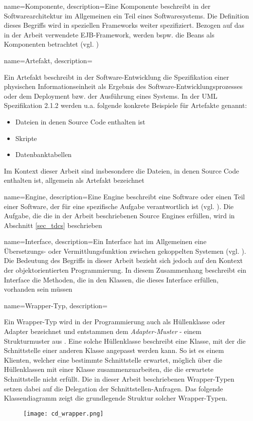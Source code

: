 

{
    name=Komponente,
    description={Eine Komponente beschreibt in der Softwarearchitektur im Allgemeinen ein Teil eines Softwaresystems. Die Definition dieses Begriffs wird in speziellen Frameworks weiter spezifiziert. Bezogen auf das in der Arbeit verwendete EJB-Framework, werden bspw. die Beans als Komponenten betrachtet (vgl. \cite{ejbspec})}
}
{
    name=Artefakt,
    description={Ein Artefakt beschreibt in der Software-Entwicklung die Spezifikation einer physischen Informationseinheit als Ergebnis des Software-Entwicklungsprozesses oder dem Deployment bzw. der Ausführung eines Systems. In der UML Spezifikation 2.1.2 \cite{uml} werden u.a. folgende konkrete Beispiele für Artefakte genannt:
    \begin{itemize}
    \item Dateien in denen Source Code enthalten ist
    \item Skripte
    \item Datenbanktabellen    
    \end{itemize}
    \noindent
    Im Kontext dieser Arbeit sind insbesondere die Dateien, in denen Source Code enthalten ist, allgemein als Artefakt bezeichnet}
}


{
    name=Engine,
    description={Eine Engine beschreibt eine Software oder einen Teil einer Software, der für eine spezifische Aufgabe verantwortlich ist (vgl. \cite{pcmag}). Die Aufgabe, die die in der Arbeit beschriebenen Source Engines erfüllen, wird in Abschnitt \ref{sec_tdcs} beschrieben}
}


{
    name=Interface,
    description={Ein Interface hat im Allgemeinen eine Übersetzungs- oder Vermittlungsfunktion zwischen gekoppelten Systemen (vgl. \cite{interfaces}). Die Bedeutung des Begriffs in dieser Arbeit bezieht sich jedoch auf den Kontext der objektorientierten Programmierung. In diesem Zusammenhang beschreibt ein Interface die Methoden, die in den Klassen, die dieses Interface erfüllen, vorhanden sein müssen}
}


{
    name=Wrapper-Typ,
    description={Ein Wrapper-Typ wird in der Programmierung auch als Hüllenklasse oder Adapter bezeichnet und entstammen dem \emph{Adapter-Muster} - einem Strukturmuster aus \cite{gof}. Eine solche Hüllenklasse beschreibt eine Klasse, mit der die Schnittstelle einer anderen Klasse angepasst werden kann. So ist es einem Klienten, welcher eine bestimmte Schnittstelle erwartet, möglich über die Hüllenklassen mit einer Klasse zusammenzuarbeiten, die die erwartete Schnittstelle nicht erfüllt. Die in dieser Arbeit beschriebenen Wrapper-Typen setzen dabei auf die Delegation der Schnittstellen-Anfragen. Das folgende Klassendiagramm zeigt die grundlegende Struktur solcher Wrapper-Typen. 
\begin{figure}[!h]
\centering
\texttt{[image: cd\_wrapper.png]}
\label{bild}
\end{figure} 
    }
}

